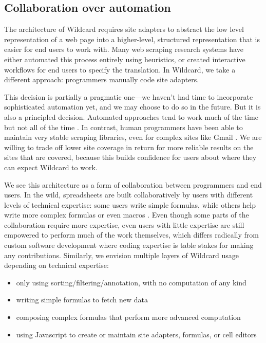 \documentclass[english,submission]{programming}
\providecommand{\tightlist}{%
  \setlength{\itemsep}{0pt}\setlength{\parskip}{0pt}}
\begin{document}
\hypertarget{collaboration-over-automation}{%
\subsection{Collaboration over
automation}\label{collaboration-over-automation}}

The architecture of Wildcard requires site adapters to abstract the low
level representation of a web page into a higher-level, structured
representation that is easier for end users to work with. Many web
scraping research systems have either automated this process entirely
using heuristics, or created interactive workflows for end users to
specify the translation. In Wildcard, we take a different approach:
programmers manually code site adapters.

This decision is partially a pragmatic one---we haven't had time to
incorporate sophisticated automation yet, and we may choose to do so in
the future. But it is also a principled decision. Automated approaches
tend to work much of the time but not all of the time
\autocite{bolin2005} \autocite{little2010}. In contrast, human
programmers have been able to maintain very stable scraping libraries,
even for complex sites like Gmail \autocite{streak,talwar2019}. We are
willing to trade off lower site coverage in return for more reliable
results on the sites that are covered, because this builds confidence
for users about where they can expect Wildcard to work.

We see this architecture as a form of collaboration between programmers
and end users. In the wild, spreadsheets are built collaboratively by
users with different levels of technical expertise: some users write
simple formulas, while others help write more complex formulas or even
macros \autocite{nardi1990}. Even though some parts of the collaboration
require more expertise, even users with little expertise are still
empowered to perform much of the work themselves, which differs
radically from custom software development where coding expertise is
table stakes for making any contributions. Similarly, we envision
multiple layers of Wildcard usage depending on technical expertise:

\begin{itemize}
\tightlist
\item
  only using sorting/filtering/annotation, with no computation of any
  kind
\item
  writing simple formulas to fetch new data
\item
  composing complex formulas that perform more advanced computation
\item
  using Javascript to create or maintain site adapters, formulas, or
  cell editors
\end{itemize}
\end{document}
